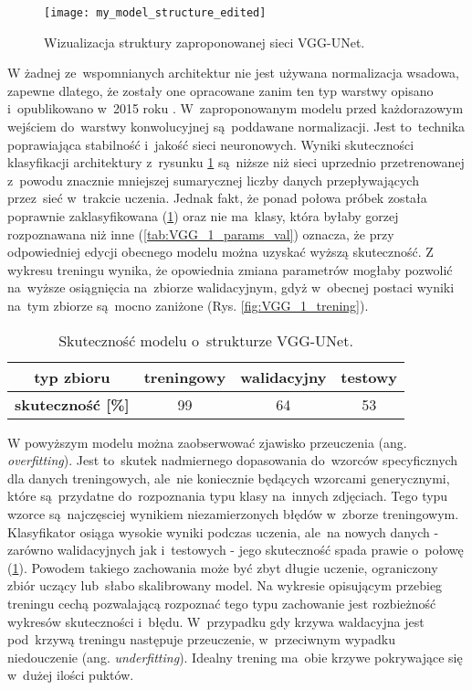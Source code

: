 \begin{figure}[h]
	\centering
	\centering
		\texttt{[image: my\_model\_structure\_edited]}	
	\caption{Wizualizacja struktury zaproponowanej sieci VGG-UNet.}
	\label{fig:vgg_unet_visualisation}
\end{figure}

{\parindent0pt
W żadnej ze~wspomnianych architektur nie jest używana normalizacja wsadowa, zapewne dlatego, że zostały one opracowane zanim ten typ warstwy opisano i~opublikowano w~2015 roku \cite{batch_normalisation}. W~zaproponowanym modelu przed każdorazowym wejściem do~warstwy konwolucyjnej są~poddawane normalizacji. Jest to~technika poprawiająca stabilność i~jakość sieci neuronowych. Wyniki skuteczności klasyfikacji architektury z~rysunku \ref{fig:vgg_unet_visualisation} są~niższe niż sieci uprzednio przetrenowanej z~powodu znacznie mniejszej sumarycznej liczby danych przepływających przez~sieć w~trakcie uczenia. Jednak fakt, że ponad połowa próbek została poprawnie zaklasyfikowana (\ref{tab:VGG_1_acc}) oraz nie ma~klasy, która byłaby gorzej rozpoznawana niż inne (\ref{tab:VGG_1_params_val}) oznacza, że przy odpowiedniej edycji obecnego modelu można uzyskać wyższą skuteczność. Z wykresu treningu wynika, że opowiednia zmiana parametrów mogłaby pozwolić na~wyższe osiągnięcia na~zbiorze walidacyjnym, gdyż w~obecnej postaci wyniki na~tym zbiorze są~mocno zaniżone (Rys. \ref{fig:VGG_1_trening}).

 \begin{table}[h!]
\centering
\caption[Short Heading]{Skuteczność modelu o~strukturze VGG-UNet.}
\label{tab:VGG_1_acc}
\begin{tabular}{|c|c|c|c|}
\hline
\textbf{typ zbioru}           & \textbf{treningowy} & \textbf{walidacyjny} & \textbf{testowy} \\ \hline
\textbf{skuteczność {[}\%{]}} & 99                  & 64                   & 53               \\ \hline
\end{tabular}
\end{table}

W powyższym modelu można zaobserwować zjawisko przeuczenia (ang. \textit{overfitting}). Jest to~skutek nadmiernego dopasowania do~wzorców specyficznych dla danych treningowych, ale~nie koniecznie będących wzorcami generycznymi, które są~przydatne do~rozpoznania typu klasy na~innych zdjęciach. Tego typu wzorce są~najczęsciej wynikiem niezamierzonych błędów w~zborze treningowym. Klasyfikator osiąga wysokie wyniki podczas uczenia, ale~na nowych danych - zarówno walidacyjnych jak i~testowych - jego skuteczność spada prawie o~połowę (\ref{tab:VGG_1_acc}). Powodem takiego zachowania może być zbyt długie uczenie, ograniczony zbiór uczący lub~słabo skalibrowany model. Na wykresie opisującym przebieg treningu cechą pozwalającą rozpoznać tego typu zachowanie jest rozbieżność wykresów skuteczności i~błędu. W~przypadku gdy krzywa waldacyjna jest pod~krzywą treningu następuje przeuczenie, w~przeciwnym wypadku niedouczenie (ang. \textit{underfitting}). Idealny trening ma~obie krzywe pokrywające się w~dużej ilości puktów.

}
